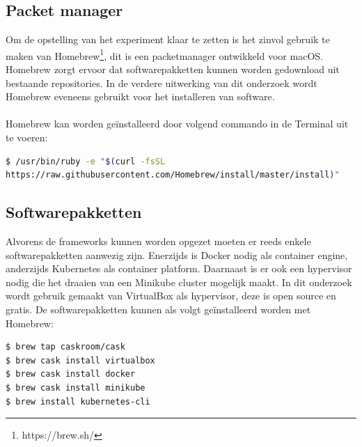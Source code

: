 \subsection{Packet manager}
Om de opstelling van het experiment klaar te zetten is het zinvol gebruik te maken van Homebrew\footnote{https://brew.sh/}, dit is een packetmanager ontwikkeld voor macOS. Homebrew zorgt ervoor dat softwarepakketten kunnen worden gedownload uit bestaande repositories. In de verdere uitwerking van dit onderzoek wordt Homebrew eveneens gebruikt voor het installeren van software.\\\\
Homebrew kan worden geïnstalleerd door volgend commando in de Terminal uit te voeren: 
\begin{lstlisting}[language=bash]
$ /usr/bin/ruby -e "$(curl -fsSL 
https://raw.githubusercontent.com/Homebrew/install/master/install)"
\end{lstlisting}

\subsection{Softwarepakketten}
Alvorens de frameworks kunnen worden opgezet moeten er reeds enkele softwarepakketten aanwezig zijn. Enerzijds is Docker nodig als container engine, anderzijds Kubernetes als container platform. Daarnaast is er ook een hypervisor nodig die het draaien van een Minikube cluster mogelijk maakt. In dit onderzoek wordt gebruik gemaakt van VirtualBox als hypervisor, deze is open source en gratis. De softwarepakketten kunnen als volgt geïnstalleerd worden met Homebrew:        
\begin{lstlisting}[language=bash]
$ brew tap caskroom/cask
$ brew cask install virtualbox
$ brew cask install docker
$ brew cask install minikube
$ brew install kubernetes-cli
\end{lstlisting}

